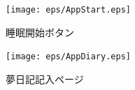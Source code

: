 \begin{figure}[htbp]
 \begin{minipage}{0.45\hsize}
  \begin{center}
   \texttt{[image: eps/AppStart.eps]}
  \end{center}
  \caption{睡眠開始ボタン}
  \label{le05}
 \end{minipage}
 \begin{minipage}{0.45\hsize}
  \begin{center}
   \texttt{[image: eps/AppDiary.eps]}
  \end{center}
  \caption{夢日記記入ページ}
  \label{le06}
 \end{minipage}
\end{figure}
